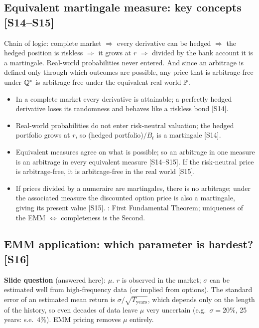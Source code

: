 \documentclass[10pt]{article}
\begin{document}
\subsection{Equivalent martingale measure: key concepts [S14--S15]}
\begin{idea}
Chain of logic: complete market $\Rightarrow$ every derivative can be hedged $\Rightarrow$ the hedged position is riskless $\Rightarrow$ it grows at $r$ $\Rightarrow$ divided by the bank account it is a martingale. Real-world probabilities never entered. And since an arbitrage is defined only through which outcomes are possible, any price that is arbitrage-free under $\mathbb{Q}^*$ is arbitrage-free under the equivalent real-world $\mathbb{P}$.
\end{idea}
\begin{itemize}
\item In a complete market every derivative is attainable; a perfectly hedged derivative loses its randomness and behaves like a riskless bond [S14].
\item Real-world probabilities do not enter risk-neutral valuation; the hedged portfolio grows at $r$, so (hedged portfolio)$/B_t$ is a martingale [S14].
\item Equivalent measures agree on what is possible; so an arbitrage in one measure is an arbitrage in every equivalent measure [S14--S15]. If the risk-neutral price is arbitrage-free, it is arbitrage-free in the real world [S15].
\item If prices divided by a numeraire are martingales, there is no arbitrage; under the associated measure the discounted option price is also a martingale, giving its present value [S15]. \beyond: First Fundamental Theorem; uniqueness of the EMM $\iff$ completeness is the Second.
\end{itemize}

\subsection{EMM application: which parameter is hardest? [S16]}
\textbf{Slide question} (answered here): $\mu$. $r$ is observed in the market; $\sigma$ can be estimated well from high-frequency data (or implied from options). The standard error of an estimated mean return is $\sigma/\sqrt{T_{\text{years}}}$, which depends only on the length of the history, so even decades of data leave $\mu$ very uncertain (e.g.\ $\sigma=20\%$, 25 years: s.e.\ $4\%$). EMM pricing removes $\mu$ entirely.
\end{document}
